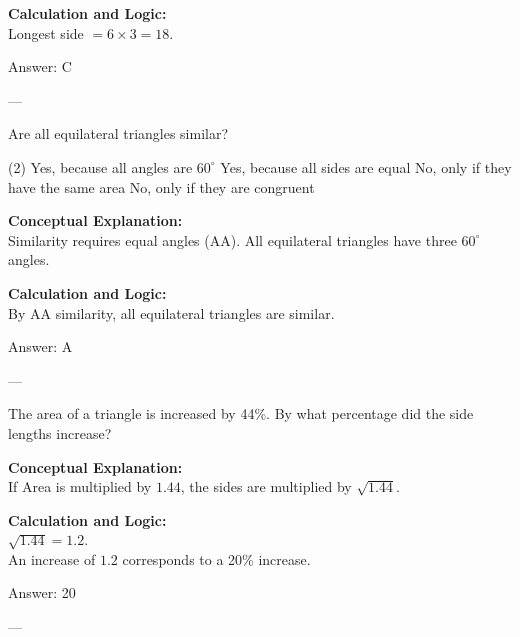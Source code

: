\documentclass[11pt,paper=a4,answers]{exam}
\begin{document}
\begin{questions}
\begin{solution}
\vspace{10pt}
\textbf{Calculation and Logic:} \\
Longest side $= 6 \times 3 = 18$.

\vspace{15pt}
Answer: \colorbox{yellow!100}{C}
\end{solution}

---

\question
Are all equilateral triangles similar?
\begin{tasks}(2)
    \task Yes, because all angles are $60^\circ$
    \task Yes, because all sides are equal
    \task No, only if they have the same area
    \task No, only if they are congruent
\end{tasks}

\begin{solution}
\textbf{Conceptual Explanation:} \\
Similarity requires equal angles (AA). All equilateral triangles have three $60^\circ$ angles.

\vspace{10pt}
\textbf{Calculation and Logic:} \\
By AA similarity, all equilateral triangles are similar.

\vspace{15pt}
Answer: \colorbox{yellow!100}{A}
\end{solution}

---

\question
The area of a triangle is increased by 44\%. By what percentage did the side lengths increase?

\begin{solution}
\textbf{Conceptual Explanation:} \\
If Area is multiplied by $1.44$, the sides are multiplied by $\sqrt{1.44}$.

\vspace{10pt}
\textbf{Calculation and Logic:} \\
$\sqrt{1.44} = 1.2$. \\
An increase of $1.2$ corresponds to a 20\% increase.

\vspace{15pt}
Answer: \colorbox{yellow!100}{20}
\end{solution}

---


\end{questions}
\end{document}
